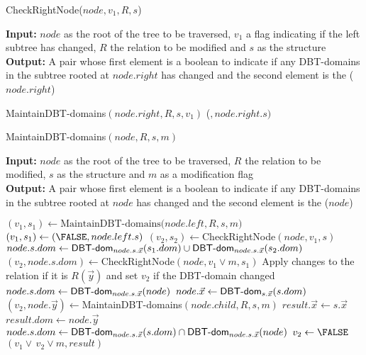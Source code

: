 \documentclass[12pt]{article}
\begin{document}
\begin{algorithm}
\caption{CheckRightNode($node,v_{1},R,s$)}
\label{alg:sub}
\textbf{Input:} $node$ as the root of the tree to be traversed, $v_{1}$ a flag indicating if the left subtree has changed, $R$ the relation to be modified and $s$ as the structure \\
\textbf{Output:} A pair whose first element is a boolean to indicate if any DBT-domains in the subtree rooted at $node.right$ has changed
and the second element is the \dom($node.right$)
\begin{algorithmic}[1]
\RETURN MaintainDBT-domains$(node.right,R,s,v_{1})$
\ELSE
\RETURN (\FALSE$,node.right.s)$
\ENDIF
\end{algorithmic}
\end{algorithm}
\begin{algorithm}
\caption{MaintainDBT-domains$(node,R,s,m)$}
\label{alg:MD}
\textbf{Input:} $node$ as the root of the tree to be traversed, $R$ the relation to be modified, $s$ as the structure and $m$ as a modification flag\\
\textbf{Output:} A pair whose first element is a boolean to indicate if any DBT-domains in the subtree rooted at $node$ has changed
and the second element is the \dom($node$)
\begin{algorithmic}[1]
\label{lst:ml1}
\STATE $(v_{1},s_{1})\gets \text{MaintainDBT-domains($node.left,R,s,m$)}$
\ELSE
\STATE $(v_{1},s_{1})\gets (\FALSE,node.left.s)$
\ENDIF
\label{lst:ml2}
\STATE $(v_{2},s_{2})\gets$CheckRightNode$(node,v_{1},s)$
\STATE  $node.s.dom\gets \text{\textsf{DBT-dom}}_{node.s.\vec x}(s_{1}.dom)\cup\text{\textsf{DBT-dom}}_{node.s.\vec x}(s_{2}.dom)$
\STATE $(v_{2},node.s.dom)\gets$CheckRightNode$(node,v_{1}\lor m,s_{1})$
\STATE Apply changes to the relation if it is $R(\vec{y})$ and set $v_{2}$ \TRUE{} if the DBT-domain changed
\STATE $node.s.dom\gets\text{\textsf{DBT-dom}}_{node.s.\vec{x}}(node)$
\STATE $node.\vec{x}\gets\text{\textsf{DBT-dom}}_{s.\vec{x}}(s.dom)$
\STATE $(v_{2},node.\vec{y})\gets$MaintainDBT-domains$(node.child,R,s,m)$%
\STATE $result.\vec{x}\gets s.\vec{x}$
\STATE $result.dom\gets node.\vec{y}$
\ELSE
\STATE $node.s.dom\gets \text{\textsf{DBT-dom}}_{node.s.\vec{x}}(s.dom)\cap\text{\textsf{DBT-dom}}_{node.s.\vec{x}}(node)$%
\STATE $v_{2}\gets \FALSE$
\ENDIF
\RETURN $(v_{1}\lor\,v_{2}\lor m,result)$
\end{algorithmic}
\end{algorithm}
\end{document}
